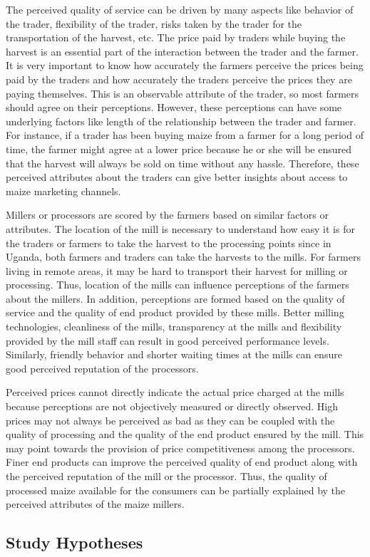 \documentclass[12pt,english]{article}\usepackage[]{graphicx}\usepackage[]{color}
\begin{document}
\begin{onehalfspace}
The perceived quality of service can be driven by many aspects like
behavior of the trader, flexibility of the trader, risks taken by
the trader for the transportation of the harvest, etc. The price paid
by traders while buying the harvest is an essential part of the interaction
between the trader and the farmer. It is very important to know how
accurately the farmers perceive the prices being paid by the traders
and how accurately the traders perceive the prices they are paying
themselves. This is an observable attribute of the trader, so most
farmers should agree on their perceptions. However, these perceptions
can have some underlying factors like length of the relationship between
the trader and farmer. For instance, if a trader has been buying maize
from a farmer for a long period of time, the farmer might agree at
a lower price because he or she will be ensured that the harvest will
always be sold on time without any hassle. Therefore, these perceived
attributes about the traders can give better insights about access
to maize marketing channels. 

Millers or processors are scored by the farmers based on similar factors
or attributes. The location of the mill is necessary to understand
how easy it is for the traders or farmers to take the harvest to the
processing points since in Uganda, both farmers and traders can take
the harvests to the mills. For farmers living in remote areas, it
may be hard to transport their harvest for milling or processing.
Thus, location of the mills can influence perceptions of the farmers
about the millers. In addition, perceptions are formed based on the
quality of service and the quality of end product provided by these
mills. Better milling technologies, cleanliness of the mills, transparency
at the mills and flexibility provided by the mill staff can result
in good perceived performance levels. Similarly, friendly behavior
and shorter waiting times at the mills can ensure good perceived reputation
of the processors.

Perceived prices cannot directly indicate the actual price charged
at the mills because perceptions are not objectively measured or directly
observed. High prices may not always be perceived as bad as they can
be coupled with the quality of processing and the quality of the end
product ensured by the mill. This may point towards the provision
of price competitiveness among the processors. Finer end products
can improve the perceived quality of end product along with the perceived
reputation of the mill or the processor. Thus, the quality of processed
maize available for the consumers can be partially explained by the
perceived attributes of the maize millers. 

\newpage{}
\end{onehalfspace}
\begin{singlespace}

\section{Study Hypotheses\label{sec:Study-Hypotheses}}
\end{singlespace}
\end{document}
